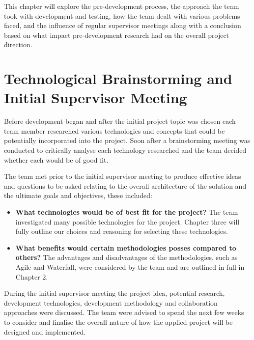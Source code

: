 \vspace{5mm} %

This chapter will explore the pre-development process, the approach the team took with development and testing, how the team dealt with various problems faced, and the influence of regular supervisor meetings along with a conclusion based on what impact pre-development research had on the overall project direction.

\section{Technological Brainstorming and Initial Supervisor Meeting}
Before development began and after the initial project topic was chosen each team member researched various technologies and concepts that could be potentially incorporated into the project. Soon after a brainstorming meeting was conducted to critically analyse each technology researched and the team decided whether each would be of good fit.

\vspace{5mm} %

The team met prior to the initial supervisor meeting to produce effective ideas and questions to be asked relating to the overall architecture of the solution and the ultimate goals and objectives, these included:

\begin{itemize}


    \item \textbf{What technologies would be of best fit for the project?}
The team investigated many possible technologies for the project. Chapter three will fully outline our choices and reasoning for selecting these technologies.

    \item \textbf{What benefits would certain methodologies posses compared to others?}
The advantages and disadvantages of the methodologies, such as Agile and Waterfall, were considered by the team and are outlined in full in Chapter 2.
\end{itemize}

During the initial supervisor meeting the project idea, potential research, development technologies, development methodology and collaboration approaches were discussed. The team were advised to spend the next few weeks to consider and finalise the overall nature of how the applied project will be designed and implemented.

